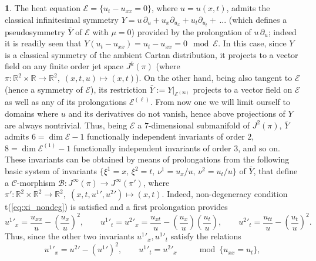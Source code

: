 \documentclass[12pt,english]{elsarticle}
\theoremstyle{plain}
\theoremstyle{plain}
\theoremstyle{remark}
\theoremstyle{plain}
\theoremstyle{definition}
\theoremstyle{definition}
\newtheorem{example}[thm]{\protect\examplename}
\providecommand{\examplename}{Example}
\begin{document}
\begin{example}
\label{exa:Cole-Hopf-II}%
The heat equation $\mathcal{E}=\{u_{t}-u_{xx}=0\}$, where $u=u(x,t)$, admits
the classical infinitesimal symmetry
$Y=u\,\partial _{u}+u_{x}\partial _{u_{x}}+u_{t}\partial _{u_{t}}+\,...$
(which defines a pseudosymmetry $\bar{Y}$ of $\mathcal{E}$ with
$\mu =0$) provided by the prolongation of $u\,\partial _{u}$; indeed it
is readily seen that
$Y(u_{t}-u_{xx})=u_{t}-u_{xx}=0\mod{\mathcal{E}}$. In this case, since
$Y$ is a classical symmetry of the ambient Cartan distribution, it projects
to a vector field on any finite order jet space $J^{k}(\pi )$ (where
$\pi :\mathbb{R}^{2}\times \mathbb{R}\rightarrow \mathbb{R}^{2},\;(x,t,u)
\mapsto (x,t)$). On the other hand, being also tangent to
$\mathcal{E}$ (hence a symmetry of $\mathcal{E}$), its restriction
$\bar{Y}:=\left .Y\right |_{\mathcal{E}^{(\infty )}}$ projects to a vector
field on $\mathcal{E}$ as well as any of its prolongations
$\mathcal{E}^{(\ell )}$. From now one we will limit ourself to domains
where $u$ and its derivatives do not vanish, hence above projections of
$Y$ are always nontrivial. Thus, being $\mathcal{E}$ a $7$-dimensional
submanifold of $J^{2}(\pi )$, $\bar{Y}$ admits
$6=\dim \mathcal{E}-1$ functionally independent invariants of order
$2$, $8=\dim \mathcal{E}^{(1)}-1$ functionally independent invariants of
order $3$, and so on. These invariants can be obtained by means of prolongations
from the following basic system of invariants
$\{\xi ^{1}=x,\,\xi ^{2}=t,\,\nu ^{1}=u_{x}/u,\,\nu ^{2}=u_{t}/u\}$ of
$\bar{Y}$, that define a $\mathcal{C}$-morphism
$\mathcal{B}:J^{\infty}(\pi )\rightarrow J^{\infty}(\pi ')$, where
$\pi ':\mathbb{R}^{2}\times \mathbb{R}^{2}\rightarrow \mathbb{R}^{2},
\;(x,t,u^{1}{}',u^{2}{}')\mapsto (x,t)$. Indeed, non-degeneracy condition
t{(\ref{eq:xi_nondeg})} is satisfied and a first prolongation provides
%
\begin{equation*}
u^{1}{}'_{x}=\frac{u_{xx}}{u}-\left (\frac{u_{x}}{u}\right )^{2},
\qquad u^{1}{}'_{t}=u^{2}{}'_{x}=\frac{u_{xt}}{u}-\left (
\frac{u_{x}}{u}\right )\left (\frac{u_{t}}{u}\right ),\qquad u^{2}{}'_{t}=
\frac{u_{tt}}{u}-\left (\frac{u_{t}}{u}\right )^{2}.
\end{equation*}
%
Thus, since the other two invariants $u^{1}{}'_{x},u^{1}{}'_{t}$ satisfy
the relations
%
\begin{equation*}
u^{1}{}'_{x}=u^{2}{}'-\left (u^{1}{}'\right )^{2},\qquad u^{1}{}'_{t}=u^{2}{}'_{x}
\qquad \mod{\{u_{xx}=u_{t}\}},
\end{equation*}

\end{example}
\end{document}
